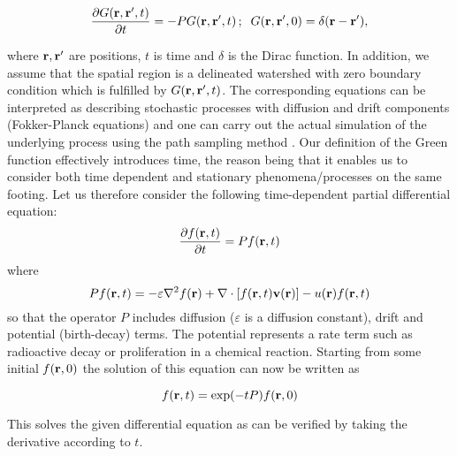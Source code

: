 \documentclass[fleqn,12pt,twoside]{article}
\begin{document}
\begin{equation}
{\partial G({\bf r},{\bf r'},t)
\over \partial t} =-P G({\bf r},{\bf r'},t)\, ;
\;\; G({\bf r},{\bf r'},0) =\delta ({\bf r}-{\bf r'}),
\end{equation}

\noindent
 where ${\bf r},{\bf r'}$ are positions,
$t$ is time and $\delta$ is the Dirac function. In addition,
 we assume that the spatial region is a delineated watershed with 
zero boundary condition which is fulfilled by $G({\bf r},{\bf r'},t)$. 
The corresponding equations can be interpreted 
as describing stochastic processes with 
diffusion and drift components (Fokker-Planck equations)
 and one can carry out the actual simulation of the underlying process
  using the path sampling method \cite{gardiner85}.
Our definition of the Green function effectively introduces time,
the reason being that it enables us to consider both 
time dependent and stationary phenomena/processes on the same 
footing.
Let us therefore consider the following  time-dependent 
partial differential equation:
\begin{equation}
{\partial f({\bf r},t) \over \partial t}=P f({\bf r},t)
\end{equation}
\noindent
where
\begin{equation}
P f({\bf r},t)=-\varepsilon \nabla^2 f({\bf r})
+ \nabla\cdot [f({\bf r},t){\bf v}({\bf r})]
- u({\bf r}) f({\bf r},t)
\end{equation}
so that the operator $P$ includes diffusion ($\varepsilon$ is a diffusion
constant), drift and potential (birth-decay) terms.
The potential represents a rate term
such as radioactive decay or proliferation in a chemical reaction.
Starting from some initial $f({\bf r},0)$ the solution of this equation
can now be written as

\begin{equation}
\label{eq:gensolution}
f({\bf r},t)=\exp(-tP) f({\bf r},0)
\end{equation}

\noindent
This solves the given differential equation 
as can be verified by taking the derivative
according to $t$. 

%
%
%
%
\end{document}

